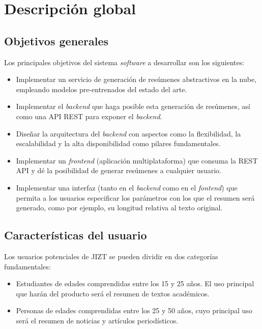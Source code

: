 \section{Descripción global}

\subsection{Objetivos generales}

Los principales objetivos del sistema \emph{software} a desarrollar son los siguientes:

\vspace{-0.3cm}
\begin{itemize} [\textbullet]
	\item Implementar un servicio de generación de resúmenes abstractivos en la nube, empleando modelos pre-entrenados del estado del arte.
	\vspace{-0.1cm}
	\item Implementar el \emph{backend} que haga posible esta generación de resúmenes, así como una API REST para exponer el \emph{backend}.
	\vspace{-0.1cm}
	\item Diseñar la arquitectura del \emph{backend} con aspectos como la flexibilidad, la escalabilidad y la alta disponibilidad como pilares fundamentales.
	\vspace{-0.1cm}
	\item Implementar un \emph{frontend} (aplicación multiplataforma) que consuma la REST API y dé la posibilidad de generar resúmenes a cualquier usuario.
	\vspace{-0.1cm}
	\item Implementar una interfaz (tanto en el \emph{backend} como en el \emph{fontend}) que permita a los usuarios especificar los parámetros con los que el resumen será generado, como por ejemplo, su longitud relativa al texto original.
	
\end{itemize}


\subsection{Características del usuario}

Los usuarios potenciales de JIZT se pueden dividir en dos categorías fundamentales:

\vspace{-0.3cm}
\begin{itemize} [\textbullet]
	\item Estudiantes de edades comprendidas entre los 15 y 25 años. El uso principal que harán del producto será el resumen de textos académicos.
	\item Personas de edades comprendidas entre los 25 y 50 años, cuyo principal uso será el resumen de noticias y artículos periodísticos.
\end{itemize}


